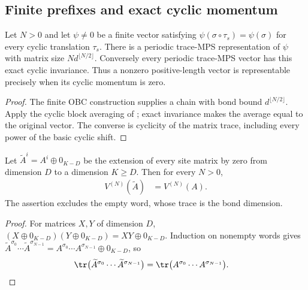 \subsection{Finite prefixes and exact cyclic momentum}
\label{sec:ground_state_finite_prefix}

\begin{lemma}
    \label{lem:periodic_finite_cyclic_representation}
    \leanok
    Let $N>0$ and let $\psi\ne0$ be a finite vector satisfying
    $\psi(\sigma\circ\tau_s)=\psi(\sigma)$ for every cyclic translation
    $\tau_s$. There is a periodic trace-MPS representation of $\psi$
    with matrix size $N d^{\lfloor N/2\rfloor}$. Conversely every
    periodic trace-MPS vector has this exact cyclic invariance.
    Thus a nonzero positive-length vector is representable precisely
    when its cyclic momentum is zero.
\end{lemma}
\begin{proof}\leanok
    The finite OBC construction supplies a chain with bond bound
    $d^{\lfloor N/2\rfloor}$. Apply the cyclic block averaging of
    \cite[Theorem~3]{PerezGarcia2007Matrix}; exact invariance makes the
    average equal to the original vector. The converse is cyclicity
    of the matrix trace, including every power of the basic cyclic shift.
\end{proof}

\begin{lemma}
    \label{lem:periodic_uniform_bond_padding}
    \leanok
    Let $\widetilde A^i=A^i\oplus0_{K-D}$ be the extension of every site
    matrix by zero from dimension $D$ to a dimension $K\ge D$. Then for
    every $N>0$,
    \begin{align}
        V^{(N)}(\widetilde A) & =V^{(N)}(A).
        \label{eq:periodic_uniform_bond_padding}
    \end{align}
    The assertion excludes the empty word, whose trace is the
    bond dimension.
\end{lemma}
\begin{proof}\leanok
    For matrices $X,Y$ of dimension $D$,
    $(X\oplus0_{K-D})(Y\oplus0_{K-D})=XY\oplus0_{K-D}$. Induction on
    nonempty words gives
    $\widetilde A^{\sigma_0}\cdots\widetilde A^{\sigma_{N-1}}
        =A^{\sigma_0}\cdots A^{\sigma_{N-1}}\oplus0_{K-D}$, so
    \begin{align}
        \tr\bigl(\widetilde A^{\sigma_0}\cdots\widetilde A^{\sigma_{N-1}}\bigr)
         & =\tr\bigl(A^{\sigma_0}\cdots A^{\sigma_{N-1}}\bigr).
    \end{align}
\end{proof}

